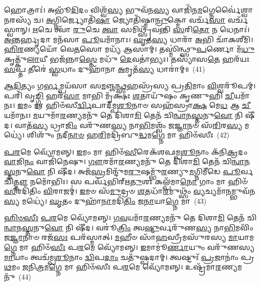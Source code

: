 𑌹𑍋𑌤𑍍𑌰𑌾𑌃॑। 𑌅𑌭𑍂᳴\-\ul{𑌦𑌿}\-𑌦𑌂 𑌵𑌿𑌶𑍍𑌵᳴\-\ul{𑌸𑍍𑌯} 𑌭𑍁𑌵᳴𑌨\-\ul{𑌸𑍍𑌯} 𑌵𑌾𑌜𑌿᳴𑌨\-\ul{𑌮}\-𑌗𑍍𑌨𑍇𑌰𑍍𑌵𑍈॑𑌶𑍍𑌵𑌾\-\ul{𑌨}\-𑌰𑌸𑍍𑌯᳴ 𑌚। \ul{𑌅}\-𑌗𑍍𑌨𑌿𑌰𑍍𑌜𑍍𑌯𑍋𑌤𑌿᳴\-\ul{𑌷𑌾} 𑌜𑍍𑌯𑍋𑌤𑌿᳴𑌷𑍍𑌮𑌾\-\ul{𑌨𑍍𑌰𑍁}\-𑌕𑍍𑌮𑍋 𑌵𑌰𑍍𑌚᳴\-\ul{𑌸𑌾} 𑌵𑌰𑍍𑌚᳴𑌸𑍍𑌵𑌾𑌨𑍍। \ul{𑌋}\-𑌚𑍇 𑌤𑍍𑌵𑌾᳴ \ul{𑌰𑍁}\-𑌚𑍇 \ul{𑌤𑍍𑌵𑌾} 𑌸𑌮𑌿𑌥𑍍𑌸𑍍𑌰᳴𑌵𑌨𑍍𑌤𑌿 \ul{𑌸}\-𑌰𑌿\-\ul{𑌤𑍋} 𑌨 𑌧𑍇𑌨𑌾𑌃॑। \ul{𑌅}\-𑌨𑍍𑌤𑌰𑍍\mbox{}\-\ul{𑌹𑍃}\-𑌦𑌾 𑌮𑌨᳴𑌸𑌾 \ul{𑌪𑍂}\-𑌯𑌮𑌾᳴𑌨𑌾𑌃। \ul{𑌘𑍃}\-𑌤\-\ul{𑌸𑍍𑌯} 𑌧𑌾𑌰𑌾᳴ \ul{𑌅}\-𑌭𑌿 𑌚𑌾᳴𑌕𑌶𑍀𑌮𑌿। \ul{𑌹𑌿}\-\-\ul{𑌰}\-𑌣𑍍𑌯𑌯𑍋᳴ 𑌵𑍇\-\ul{𑌤}\-𑌸𑍋 𑌮𑌧𑍍𑌯᳴ 𑌆𑌸𑌾𑌮𑍍। 𑌤𑌸𑍍𑌮𑌿॑𑌨𑍍𑌥𑍍𑌸𑍁\-\ul{𑌪}\-𑌰𑍍𑌣𑍋 𑌮᳴\-\ul{𑌧𑍁}\-𑌕𑍃𑌤𑍍𑌕𑍁᳴\-\ul{𑌲𑌾}\-𑌯𑍀 𑌭𑌜᳴𑌨𑍍𑌨𑌾\-\ul{𑌸𑍍𑌤𑍇} 𑌮𑌧𑍁᳴ \ul{𑌦𑍇}\-𑌵𑌤𑌾॑𑌭𑍍𑌯𑌃। 𑌤𑌸𑍍𑌯𑌾᳴𑌸\-\ul{𑌤𑍇} 𑌹𑌰᳴𑌯𑌃 \ul{𑌸}\-𑌪𑍍𑌤 𑌤𑍀𑌰𑍇॑ \ul{𑌸𑍍𑌵}\-𑌧𑌾𑌂 𑌦𑍁𑌹𑌾᳴𑌨𑌾 \ul{𑌅}\-𑌮𑍃𑌤᳴\-\ul{𑌸𑍍𑌯} 𑌧𑌾𑌰𑌾॑𑌮𑍍॥~(41)

{\anuvakamend[{\-\ul{𑌪𑍍𑌰}\-\-\ul{𑌤𑌿}\-𑌷𑍍𑌠𑌾𑌯𑍈᳴ \ul{𑌸}\-𑌹𑌸𑍍𑌰᳴𑌵𑍀𑌰𑍍𑌯𑌾 𑌪\-\ul{𑌰}\-𑌮𑌂 \ul{𑌵𑌿}\-𑌰𑌾\-\ul{𑌟𑍍𑌥𑍍𑌸}\-𑌪𑍍𑌤 𑌤𑍀𑌰𑍇᳴ \ul{𑌚}\-𑌤𑍍𑌵𑌾𑌰𑌿᳴ 𑌚}]}%

\-\ul{𑌆}\-\-\ul{𑌦𑌿}\-𑌤𑍍𑌯𑌂 𑌗\-\ul{𑌰𑍍𑌭}\-𑌮𑍍𑌪𑌯᳴𑌸𑌾 𑌸\-\ul{𑌮}\-𑌞𑍍𑌜\-\ul{𑌨𑍍𑌥𑍍𑌸}\-𑌹𑌸𑍍𑌰᳴𑌸𑍍𑌯 𑌪𑍍𑌰\-\ul{𑌤𑌿}\-𑌮𑌾𑌂 \ul{𑌵𑌿}\-𑌶𑍍𑌵𑌰𑍂᳴𑌪𑌮𑍍। 𑌪𑌰𑌿᳴ 𑌵𑍃\-\ul{𑌙𑍍𑌗𑍍𑌧𑌿} 𑌹𑌰᳴\-\ul{𑌸𑌾} 𑌮𑌾𑌭𑌿 𑌮𑍃᳴𑌕𑍍𑌷𑌃 \ul{𑌶}\-𑌤𑌾𑌯𑍁᳴𑌷𑌂 𑌕𑍃𑌣𑍁𑌹𑌿 \ul{𑌚𑍀}\-𑌯𑌮𑌾᳴𑌨𑌃। \ul{𑌇}\-𑌮𑌂 𑌮𑌾 𑌹𑌿𑍞᳴𑌸𑍀\-\ul{𑌰𑍍𑌦𑍍𑌵𑌿}\-𑌪𑌾𑌦᳴𑌮𑍍𑌪\-\ul{𑌶𑍂}\-𑌨𑌾𑍞 𑌸𑌹᳴𑌸𑍍𑌰𑌾\-\ul{𑌕𑍍𑌷} 𑌮𑍇\-\ul{𑌧} 𑌆 \ul{𑌚𑍀}\-𑌯𑌮𑌾᳴𑌨𑌃। \ul{𑌮}\-𑌯𑍁𑌮𑌾᳴\-\ul{𑌰}\-𑌣𑍍𑌯𑌮𑌨𑍁᳴ 𑌤𑍇 𑌦𑌿𑌶𑌾\-\ul{𑌮𑌿} 𑌤𑍇𑌨᳴ 𑌚𑌿\-\ul{𑌨𑍍𑌵𑌾}\-𑌨\-\ul{𑌸𑍍𑌤}\-𑌨𑍁\-\ul{𑌵𑍋} 𑌨𑌿 𑌷𑍀᳴𑌦। 𑌵𑌾𑌤᳴\-\ul{𑌸𑍍𑌯} 𑌧𑍍𑌰𑌾\-\ul{𑌜𑌿𑌂} 𑌵𑌰𑍁᳴𑌣\-\ul{𑌸𑍍𑌯} 𑌨𑌾\-\ul{𑌭𑌿}\-𑌮𑌶𑍍𑌵𑌂᳴ 𑌜\-\ul{𑌜𑍍𑌞𑌾}\-𑌨𑍞 𑌸᳴\-\ul{𑌰𑌿}\-𑌰\-\ul{𑌸𑍍𑌯} 𑌮𑌧𑍍𑌯𑍇॑। 𑌶𑌿𑌶𑍁𑌂᳴ \ul{𑌨}\-𑌦𑍀\-\ul{𑌨𑌾}\-\-\ul{𑍞} 𑌹\-\ul{𑌰𑌿}\-𑌮𑌦𑍍𑌰𑌿᳴𑌬𑍁\-\ul{𑌦𑍍𑌧}\-𑌮\-\ul{𑌗𑍍𑌨𑍇} 𑌮𑌾 𑌹𑌿𑍞᳴𑌸𑍀𑌃~(42)

\-\ul{𑌪}\-\-\ul{𑌰}\-𑌮𑍇 𑌵𑍍𑌯𑍋᳴𑌮𑌨𑍍𑌨𑍍। \ul{𑌇}\-𑌮𑌂 𑌮𑌾 𑌹𑌿𑍞᳴\-\ul{𑌸𑍀}\-𑌰𑍇𑌕᳴𑌶𑌫𑌮𑍍𑌪\-\ul{𑌶𑍂}\-𑌨𑌾𑌂 𑌕᳴𑌨𑌿\-\ul{𑌕𑍍𑌰}\-𑌦𑌂 \ul{𑌵𑌾}\-𑌜𑌿\-\ul{𑌨𑌂} 𑌵𑌾𑌜𑌿᳴𑌨𑍇𑌷𑍁। \ul{𑌗𑍗}\-𑌰𑌮𑌾᳴\-\ul{𑌰}\-𑌣𑍍𑌯𑌮𑌨𑍁᳴ 𑌤𑍇 𑌦𑌿𑌶𑌾\-\ul{𑌮𑌿} 𑌤𑍇𑌨᳴ 𑌚𑌿\-\ul{𑌨𑍍𑌵𑌾}\-𑌨\-\ul{𑌸𑍍𑌤}\-𑌨𑍁\-\ul{𑌵𑍋} 𑌨𑌿 𑌷𑍀᳴𑌦। 𑌅𑌜᳴\-\ul{𑌸𑍍𑌰}\-𑌮𑌿𑌨𑍍𑌦𑍁᳴𑌮\-\ul{𑌰𑍁}\-𑌷𑌮𑍍𑌭𑍁᳴\-\ul{𑌰}\-𑌣𑍍𑌯𑍁\-\ul{𑌮}\-𑌗𑍍𑌨𑌿𑌮𑍀᳴𑌡𑍇 \ul{𑌪𑍂}\-𑌰𑍍𑌵𑌚𑌿᳴\-\ul{𑌤𑍍𑌤𑍗} 𑌨𑌮𑍋᳴𑌭𑌿𑌃। 𑌸 𑌪𑌰𑍍𑌵᳴𑌭𑌿𑌰𑍍\mbox{}𑌋\-\ul{𑌤𑍁}\-𑌶𑌃 𑌕𑌲𑍍𑌪᳴𑌮𑌾\-\ul{𑌨𑍋} 𑌗𑌾𑌂 𑌮𑌾 𑌹𑌿𑍞᳴\-\ul{𑌸𑍀}\-𑌰𑌦𑌿᳴𑌤𑌿𑌂 \ul{𑌵𑌿}\-𑌰𑌾𑌜𑌮𑍍॑। \ul{𑌇}\-𑌮𑍞 𑌸᳴\-\ul{𑌮𑍁}\-𑌦𑍍𑌰𑍞 \ul{𑌶}\-𑌤𑌧𑌾᳴\-\ul{𑌰}\-𑌮𑍁𑌥𑍍𑌸𑌂᳴ \ul{𑌵𑍍𑌯}\-𑌚𑍍𑌯𑌮𑌾᳴\-\ul{𑌨}\-𑌮𑍍𑌭𑍁𑌵᳴𑌨\-\ul{𑌸𑍍𑌯} 𑌮𑌧𑍍𑌯𑍇॑। \ul{𑌘𑍃}\-𑌤𑌂 𑌦𑍁𑌹𑌾᳴\-\ul{𑌨𑌾}\-𑌮𑌦𑌿᳴\-\ul{𑌤𑌿𑌂} 𑌜\-\ul{𑌨𑌾}\-𑌯𑌾\-\ul{𑌗𑍍𑌨𑍇} 𑌮𑌾~(43)

\-\ul{𑌹𑌿}\-\-\ul{𑍞}\-\-\ul{𑌸𑍀𑌃} \ul{𑌪}\-\-\ul{𑌰}\-𑌮𑍇 𑌵𑍍𑌯𑍋᳴𑌮𑌨𑍍𑌨𑍍। \ul{𑌗}\-\-\ul{𑌵}\-𑌯𑌮𑌾᳴\-\ul{𑌰}\-𑌣𑍍𑌯𑌮𑌨𑍁᳴ 𑌤𑍇 𑌦𑌿𑌶𑌾\-\ul{𑌮𑌿} 𑌤𑍇𑌨᳴ 𑌚𑌿\-\ul{𑌨𑍍𑌵𑌾}\-𑌨\-\ul{𑌸𑍍𑌤}\-𑌨𑍁\-\ul{𑌵𑍋} 𑌨𑌿 𑌷𑍀᳴𑌦। 𑌵𑌰𑍂॑\-\ul{𑌤𑍍𑌰𑌿𑌂} 𑌤𑍍𑌵\-\ul{𑌷𑍍𑌟𑍁}\-𑌰𑍍𑌵𑌰𑍁᳴𑌣\-\ul{𑌸𑍍𑌯} 𑌨𑌾\-\ul{𑌭𑌿}\-𑌮𑌵𑌿𑌂᳴ 𑌜\-\ul{𑌜𑍍𑌞𑌾}\-𑌨𑌾𑍞 𑌰𑌜᳴\-\ul{𑌸𑌃} 𑌪𑌰᳴𑌸𑍍𑌮𑌾𑌤𑍍। \ul{𑌮}\-𑌹𑍀𑍞 𑌸𑌾᳴\-\ul{𑌹}\-𑌸𑍍𑌰𑍀𑌮𑌸𑍁᳴𑌰𑌸𑍍𑌯 \ul{𑌮𑌾}\-𑌯𑌾𑌮\-\ul{𑌗𑍍𑌨𑍇} 𑌮𑌾 𑌹𑌿𑍞᳴\-\ul{𑌸𑍀𑌃} 𑌪\-\ul{𑌰}\-𑌮𑍇 𑌵𑍍𑌯𑍋᳴𑌮𑌨𑍍𑌨𑍍। \ul{𑌇}\-𑌮𑌾𑌮𑍂॑\-\ul{𑌰𑍍𑌣𑌾}\-𑌯𑍁𑌂 𑌵𑌰𑍁᳴𑌣𑌸𑍍𑌯 \ul{𑌮𑌾}\-𑌯𑌾𑌂 𑌤𑍍𑌵𑌚᳴𑌮𑍍𑌪\-\ul{𑌶𑍂}\-𑌨𑌾𑌂 \ul{𑌦𑍍𑌵𑌿}\-𑌪\-\ul{𑌦𑌾𑌂} 𑌚𑌤𑍁᳴𑌷𑍍𑌪𑌦𑌾𑌮𑍍। 𑌤𑍍𑌵𑌷𑍍𑌟𑍁𑌃᳴ \ul{𑌪𑍍𑌰}\-𑌜𑌾𑌨𑌾𑌂॑ 𑌪𑍍𑌰\-\ul{𑌥}\-𑌮𑌂 \ul{𑌜}\-𑌨𑌿\-\ul{𑌤𑍍𑌰}\-𑌮\-\ul{𑌗𑍍𑌨𑍇} 𑌮𑌾 𑌹𑌿𑍞᳴𑌸𑍀𑌃 𑌪\-\ul{𑌰}\-𑌮𑍇 𑌵𑍍𑌯𑍋᳴𑌮𑌨𑍍𑌨𑍍। 𑌉𑌷𑍍𑌟𑍍𑌰᳴𑌮𑌾\-\ul{𑌰}\-𑌣𑍍𑌯𑌮𑌨𑍁᳴~(44)

